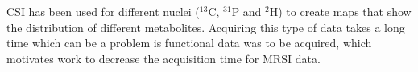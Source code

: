 

\ac{CSI} has been used for different nuclei ($^{13}$C, $^{31}$P and $^2$H) to create maps that show the distribution of different metabolites. Acquiring this type of data takes a long time which can be a problem is functional data was to be acquired, which motivates work to decrease the acquisition time for \ac{MRSI} data.


